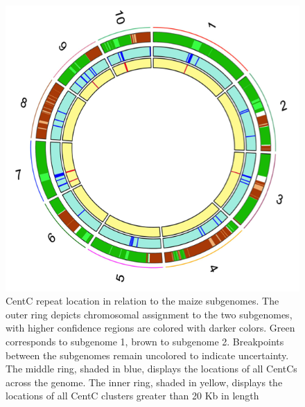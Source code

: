\begin{figure}
\includegraphics{Fig1_circos}
\caption{CentC repeat location in relation to the maize subgenomes.  The outer ring depicts chromosomal assignment to the two subgenomes, with higher confidence regions are colored with darker colors.  Green corresponds to subgenome 1, brown to subgenome 2.  Breakpoints between the subgenomes remain uncolored to indicate uncertainty. The middle ring, shaded in blue, displays the locations of all CentCs across the genome.  The inner ring, shaded in yellow, displays the locations of all CentC clusters greater than 20 Kb in length}
\label{circos}    
\end{figure}

